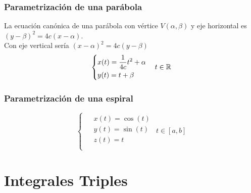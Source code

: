 \documentclass{report}
\begin{document}
      \subsection*{Parametrización de una \textbf{parábola}}
      \noindent La ecuación canónica de una parábola con vértice $V\left(\alpha,\beta\right)$ y eje horizontal es $\left(y-\beta\right)^2=4c\left(x-\alpha\right)$.\\
      Con eje vertical sería $\left(x-\alpha\right)^2=4c\left(y-\beta\right)$
      $$\begin{cases}
        \begin{aligned}
          &x(t)=\frac{1}{4c}t^2+\alpha\\
          &y(t)=t+\beta
        \end{aligned}
      \end{cases} t\in\mathbb{R}$$
      \subsection*{Parametrización de una \textbf{espiral}}
        $$\begin{cases}
          \begin{aligned}
            &x(t)=\cos(t)\\
            &y(t)=\sin(t)\\
            &z(t)=t\\
          \end{aligned}
        \end{cases} t\in[a,b]$$

\chapter{Integrales Triples}
\end{document}
